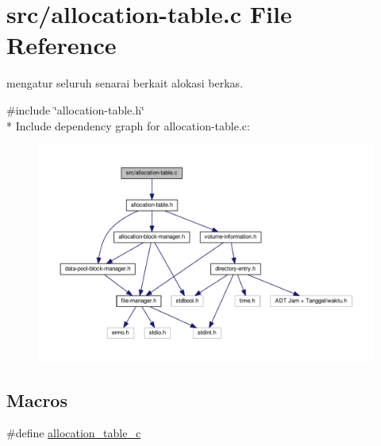 \hypertarget{allocation-table_8c}{\section{src/allocation-\/table.c File Reference}
\label{allocation-table_8c}
}


mengatur seluruh senarai berkait alokasi berkas.  


{\ttfamily \#include \char`\"{}allocation-\/table.\-h\char`\"{}}\\*
Include dependency graph for allocation-\/table.c\-:\nopagebreak
\begin{figure}[H]
\begin{center}
\leavevmode
\includegraphics[width=350pt]{allocation-table_8c__incl}
\end{center}
\end{figure}
\subsection*{Macros}
\begin{DoxyCompactItemize}
\item 
\#define \hyperlink{allocation-table_8c_afc5318de31f175f755f75812b44051c6}{allocation\-\_\-table\-\_\-c}
\end{DoxyCompactItemize}
